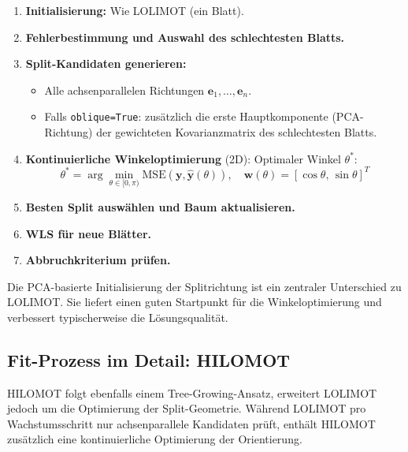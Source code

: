 \documentclass[11pt,a4paper]{report}
\begin{document}
\begin{enumerate}
\item \textbf{Initialisierung:} Wie LOLIMOT (ein Blatt).
\item \textbf{Fehlerbestimmung und Auswahl des schlechtesten Blatts.}
\item \textbf{Split-Kandidaten generieren:}
      \begin{itemize}
      \item Alle achsenparallelen Richtungen $\mathbf{e}_1, \ldots, \mathbf{e}_n$.
      \item Falls \texttt{oblique=True}: zus\"{a}tzlich die erste Hauptkomponente (PCA-Richtung)
            der gewichteten Kovarianzmatrix des schlechtesten Blatts.
      \end{itemize}
\item \textbf{Kontinuierliche Winkeloptimierung} (2D): Optimaler Winkel $\theta^*$:
      \begin{equation}
      \theta^* = \arg\min_{\theta \in [0, \pi)}
                 \mathrm{MSE}\!\left(\mathbf{y},\hat{\mathbf{y}}(\theta)\right),
      \quad \mathbf{w}(\theta) = [\cos\theta,\, \sin\theta]^T
      \label{eq:hilomot_angle_opt}
      \end{equation}
\item \textbf{Besten Split ausw\"{a}hlen und Baum aktualisieren.}
\item \textbf{WLS f\"{u}r neue Bl\"{a}tter.}
\item \textbf{Abbruchkriterium pr\"{u}fen.}
\end{enumerate}

\begin{hinweisbox}
Die PCA-basierte Initialisierung der Splitrichtung ist ein zentraler Unterschied zu LOLIMOT.
Sie liefert einen guten Startpunkt f\"{u}r die Winkeloptimierung und verbessert typischerweise
die L\"{o}sungsqualit\"{a}t.
\end{hinweisbox}

\subsection{Fit-Prozess im Detail: HILOMOT}
\label{sec:hilomot_fit_process}

HILOMOT folgt ebenfalls einem Tree-Growing-Ansatz, erweitert LOLIMOT jedoch um die
Optimierung der Split-Geometrie. W\"{a}hrend LOLIMOT pro Wachstumsschritt nur achsenparallele
Kandidaten pr\"{u}ft, enth\"{a}lt HILOMOT zus\"{a}tzlich eine kontinuierliche Optimierung
der Orientierung.
\end{document}
